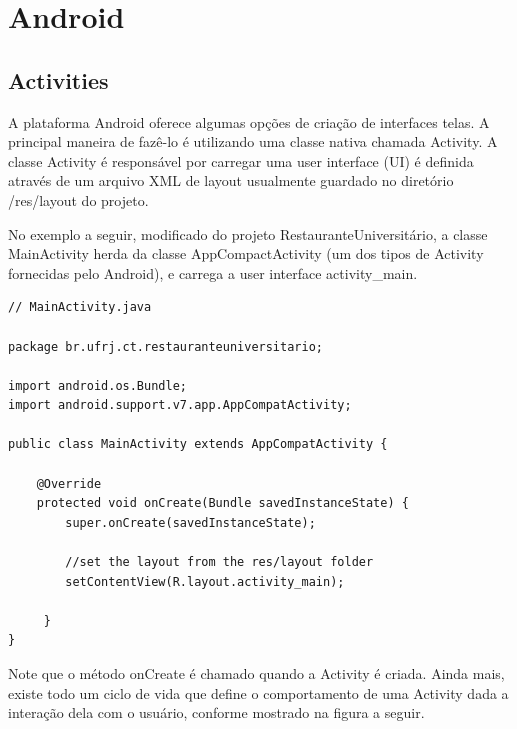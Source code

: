 \section{Android}
\subsection{Activities}
A plataforma Android oferece algumas opções de criação de interfaces telas. A principal maneira de 
fazê-lo é utilizando uma classe nativa chamada Activity. A classe Activity é responsável por carregar uma 
user interface (UI) é definida através de um arquivo XML de layout usualmente guardado no diretório 
/res/layout do projeto.

No exemplo a seguir, modificado do projeto RestauranteUniversitário, a classe MainActivity herda da classe
AppCompactActivity (um dos tipos de Activity fornecidas pelo Android), e carrega a user interface 
activity\_main.


\lstset{language=Java}

\begin{lstlisting}
// MainActivity.java

package br.ufrj.ct.restauranteuniversitario;

import android.os.Bundle;
import android.support.v7.app.AppCompatActivity;

public class MainActivity extends AppCompatActivity {
    
    @Override
    protected void onCreate(Bundle savedInstanceState) {
        super.onCreate(savedInstanceState);

        //set the layout from the res/layout folder
        setContentView(R.layout.activity_main);
        
     }
}

\end{lstlisting}

Note que o método onCreate é chamado quando a Activity é criada. Ainda mais, existe 
todo um ciclo de vida que define o comportamento de uma Activity dada a interação dela com o 
usuário, conforme mostrado na figura a seguir.

